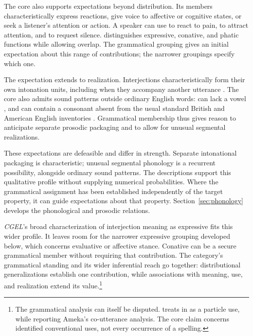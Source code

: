 \documentclass[12pt]{article}
\begin{document}
The core also supports expectations beyond distribution. Its members
characteristically express reactions, give voice to affective or cognitive
states, or seek a listener's attention or action. A speaker can use
 to react to pain,  to attract attention,
and  to request silence. \textcite[113--115]{ameka1992}
distinguishes expressive, conative, and phatic functions while allowing
overlap. The grammatical grouping gives an initial expectation about
this range of contributions; the narrower groupings specify which one.

The expectation extends to realization. Interjections characteristically
form their own intonation units, including when they accompany another
utterance \citep[108]{ameka1992}. The core also admits sound patterns
outside ordinary English words:  can lack a vowel
\citep[105--106]{ameka1992}, and
 can contain a consonant absent from the usual standard
British and American English inventories
\citep[74, 853]{quirk1985}.
Grammatical membership thus gives reason to anticipate separate prosodic
packaging and to allow for unusual segmental realizations.

These expectations are defeasible and differ in strength. Separate
intonational packaging is characteristic; unusual segmental phonology is
a recurrent possibility, alongside ordinary sound patterns. The descriptions
support this qualitative profile without supplying numerical probabilities.
Where the grammatical assignment has been established independently of
the target property, it can guide expectations about that property.
Section~\ref{sec:phonology} develops the phonological and prosodic relations.

\textit{CGEL}'s broad characterization of interjection meaning as expressive
\citep[1361]{HuddlestonPullum2002} fits this wider profile. It leaves
room for the narrower expressive grouping developed below, which concerns
evaluative or affective stance. Conative  can be a secure
grammatical member without requiring that contribution. The category's
grammatical standing and its wider inferential reach go together:
distributional generalizations establish one contribution, while associations
with meaning, use, and realization extend its value.\footnote{The grammatical analysis can
itself be disputed. \textcite[126--127 n.~5]{wilkins1992} treats  in  as a particle use, while reporting Ameka's
co-utterance analysis. The core claim
concerns identified conventional uses, not every occurrence of a spelling.}
\end{document}
